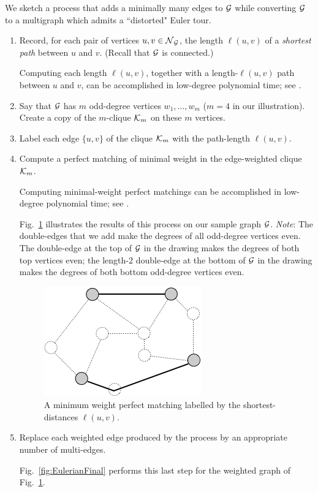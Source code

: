 We sketch a process that adds a minimally many edges to $\mbox{$\cal G$}$ while converting $\mbox{$\cal G$}$ to a multigraph which admits a ``distorted" Euler tour. 
\begin{enumerate}
\item
Record, for each pair of vertices $u, v \in \mbox{$\cal N$}_{\mbox{{\scriptsize $\cal G$}}}$, the length $\ell(u,v)$ of a {\em shortest path} between $u$ and $v$.  (Recall that $\mbox{$\cal G$}$ is connected.)

\smallskip

Computing each length $\ell(u,v)$, together with a length-$\ell(u,v)$ path between $u$ and $v$, can be accomplished in low-degree polynomial time; see \cite{CLRS}.

\item
Say that $\mbox{$\cal G$}$ has $m$ odd-degree vertices $w_1, \ldots, w_m$ ($m=4$ in our illustration).  Create a copy of the $m$-clique $\mbox{$\cal K$}_m$ on these $m$ vertices.

\item
Label each edge $\{u,v\}$ of the clique $\mbox{$\cal K$}_m$ with the path-length $\ell(u,v)$.

\item
Compute a perfect matching of minimal weight in the edge-weighted clique $\mbox{$\cal K$}_m$.

\smallskip

Computing minimal-weight perfect matchings can be accomplished in low-degree polynomial time; see \cite{CLRS}.

\smallskip

Fig.~\ref{fig:Eulerianperfectmatching} illustrates the results of this process on our sample graph $\mbox{$\cal G$}$.   {\em Note}: The double-edges that we add make the degrees of all odd-degree vertices even.  The double-edge at the top of $\mbox{$\cal G$}$ in the drawing makes the degrees of both top vertices even; the length-$2$ double-edge at the bottom of $\mbox{$\cal G$}$ in the drawing makes the degrees of both bottom odd-degree vertices even.
\begin{figure}[hbt]
\begin{center}
       \includegraphics[scale=0.4]{FiguresGraph/EulerienPerfectMatching}
       \caption{A minimum weight perfect matching labelled by the shortest-distances $\ell(u,v)$.}
              \label{fig:Eulerianperfectmatching}
\end{center}
\end{figure}

\item
Replace each weighted edge produced by the process by an appropriate number of multi-edges.

\smallskip

Fig.~\ref{fig:EulerianFinal} performs this last step for the weighted graph of Fig.~\ref{fig:Eulerianperfectmatching}.
\end{enumerate}

